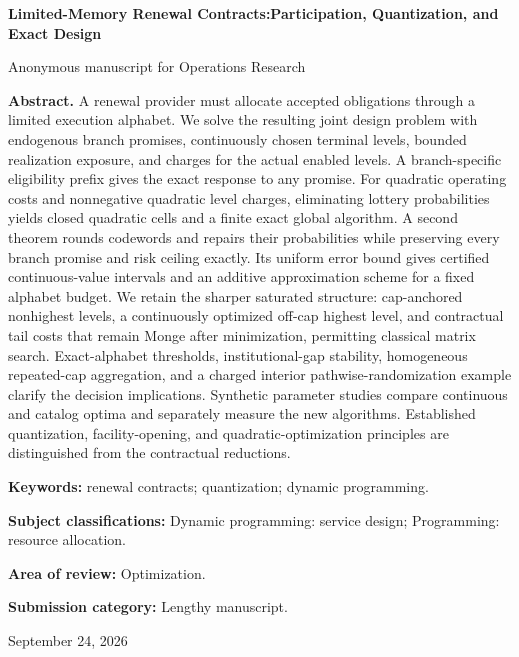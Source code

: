 \documentclass[11pt,letterpaper]{article}
\theoremstyle{definition}\newtheorem{assumption}[theorem]{Assumption}
\begin{document}
\hypersetup{pageanchor=false}
\begin{titlepage}\centering
{\Large\bfseries Limited-Memory Renewal Contracts:\newline Participation, Quantization, and Exact Design\par}
\vspace{.3in}Anonymous manuscript for Operations Research\par\vspace{.2in}
\begin{minipage}{\textwidth}\textbf{Abstract.} A renewal provider must allocate accepted obligations through a limited execution alphabet. We solve the resulting joint design problem with endogenous branch promises, continuously chosen terminal levels, bounded realization exposure, and charges for the actual enabled levels. A branch-specific eligibility prefix gives the exact response to any promise. For quadratic operating costs and nonnegative quadratic level charges, eliminating lottery probabilities yields closed quadratic cells and a finite exact global algorithm. A second theorem rounds codewords and repairs their probabilities while preserving every branch promise and risk ceiling exactly. Its uniform error bound gives certified continuous-value intervals and an additive approximation scheme for a fixed alphabet budget. We retain the sharper saturated structure: cap-anchored nonhighest levels, a continuously optimized off-cap highest level, and contractual tail costs that remain Monge after minimization, permitting classical matrix search. Exact-alphabet thresholds, institutional-gap stability, homogeneous repeated-cap aggregation, and a charged interior pathwise-randomization example clarify the decision implications. Synthetic parameter studies compare continuous and catalog optima and separately measure the new algorithms. Established quantization, facility-opening, and quadratic-optimization principles are distinguished from the contractual reductions.
\par\vspace{.15in}\textbf{Keywords:} renewal contracts; quantization; dynamic programming.
\par\vspace{.1in}\textbf{Subject classifications:} Dynamic programming: service design; Programming: resource allocation.
\par\vspace{.1in}\textbf{Area of review:} Optimization.
\par\vspace{.1in}\textbf{Submission category:} Lengthy manuscript.
\end{minipage}\vfill September 24, 2026\end{titlepage}
\end{document}
